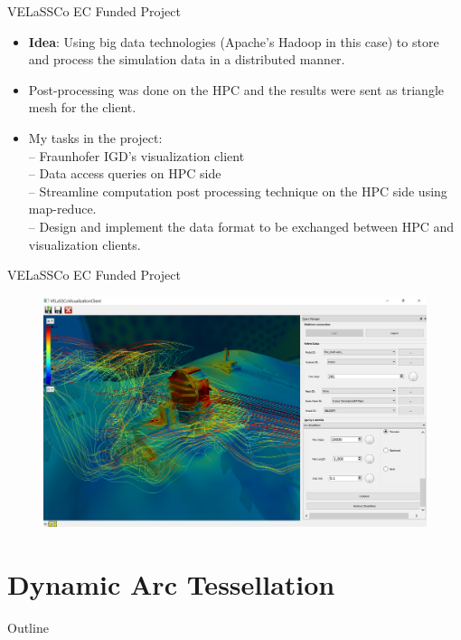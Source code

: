 \documentclass{beamer}
\begin{document}
\begin{frame}{VELaSSCo EC Funded Project}
	\begin{itemize}
		\item \textbf{Idea}: Using big data technologies (Apache's Hadoop in this case) to store and process the simulation data in a distributed manner.
		\item Post-processing was done on the HPC and the results were sent as triangle mesh for the client.
		\item My tasks in the project:\\
		-- Fraunhofer IGD's visualization client\\
		-- Data access queries on HPC side\\
		-- Streamline computation post processing technique on the HPC side using map-reduce.\\
		-- Design and implement the data format to be exchanged between HPC and visualization clients.\\
		
	\end{itemize}
\end{frame}

\begin{frame}{VELaSSCo EC Funded Project}
	\begin{figure}
		\centering
		\includegraphics[width=\linewidth]{figures/streamlines17}
	\end{figure}
\end{frame}

\section{Dynamic Arc Tessellation}

\begin{frame}{Outline}
\end{frame}
\end{document}
